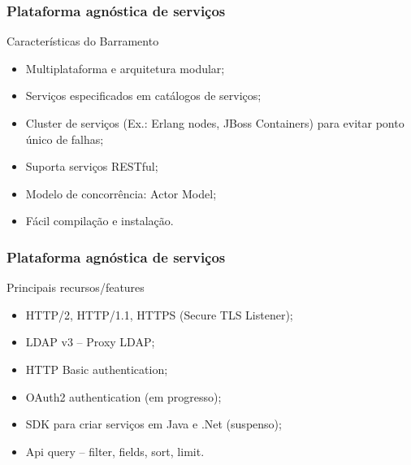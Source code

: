 \documentclass{beamer}
\begin{document}
\begin{frame}
  \frametitle{Plataforma agnóstica de serviços}

  \begin{exampleblock}{Características do Barramento}
  
	  \begin{itemize}
		\item<1->Multiplataforma e arquitetura modular;
	    \item<1->Serviços especificados em catálogos de serviços;
	    \item<1->Cluster de serviços (Ex.: Erlang nodes, JBoss Containers) para evitar ponto único de falhas;
    	    \item<1->Suporta serviços RESTful;
   	    \item<1->Modelo de concorrência: Actor Model;
    	    \item<1->Fácil compilação e instalação.
	  \end{itemize}

  \end{exampleblock}

  
\end{frame}


\begin{frame}
  \frametitle{Plataforma agnóstica de serviços}

  \begin{exampleblock}{Principais recursos/features}
  
	  \begin{itemize}
		\item<1->HTTP/2, HTTP/1.1, HTTPS (Secure TLS Listener);
	    \item<1->LDAP v3 -- Proxy LDAP;
	    \item<1->HTTP Basic authentication;
    	    \item<1->OAuth2 authentication (em progresso);
		\item<1->SDK para criar serviços em Java e .Net (suspenso);
		\item<1->Api query -- filter, fields, sort, limit.
	  \end{itemize}

  \end{exampleblock}

  
\end{frame}
\end{document}
